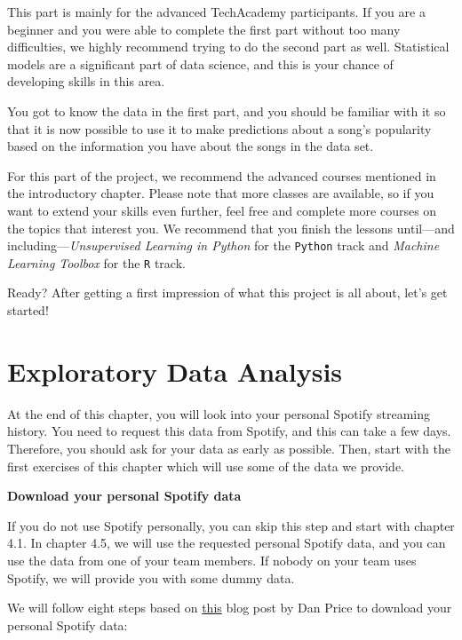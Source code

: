 \documentclass[
  11pt,
]{book}
\begin{document}
This part is mainly for the advanced TechAcademy participants. If you are a beginner and you were able to complete the first part without too many difficulties, we highly recommend trying to do the second part as well. Statistical models are a significant part of data science, and this is your chance of developing skills in this area.

You got to know the data in the first part, and you should be familiar with it so that it is now possible to use it to make predictions about a song's popularity based on the information you have about the songs in the data set.

For this part of the project, we recommend the advanced courses mentioned in the introductory chapter. Please note that more classes are available, so if you want to extend your skills even further, feel free and complete more courses on the topics that interest you. We recommend that you finish the lessons until---and including---\emph{Unsupervised Learning in Python} for the \texttt{Python} track and \emph{Machine Learning Toolbox} for the \texttt{R} track.

Ready? After getting a first impression of what this project is all about, let's get started!

\newpage

\hypertarget{exploratory-data-analysis}{%
\chapter{Exploratory Data Analysis}\label{exploratory-data-analysis}}

At the end of this chapter, you will look into your personal Spotify streaming history. You need to request this data from Spotify, and this can take a few days. Therefore, you should ask for your data as early as possible. Then, start with the first exercises of this chapter which will use some of the data we provide.

\textbf{Download your personal Spotify data}

If you do not use Spotify personally, you can skip this step and start with chapter 4.1.
In chapter 4.5, we will use the requested personal Spotify data, and you can use the data from one of your team members. If nobody on your team uses Spotify, we will provide you with some dummy data.

We will follow eight steps based on \href{https://www.makeuseof.com/tag/download-privacy-data-spotify/}{this} blog post by Dan Price to download your personal Spotify data:
\end{document}

